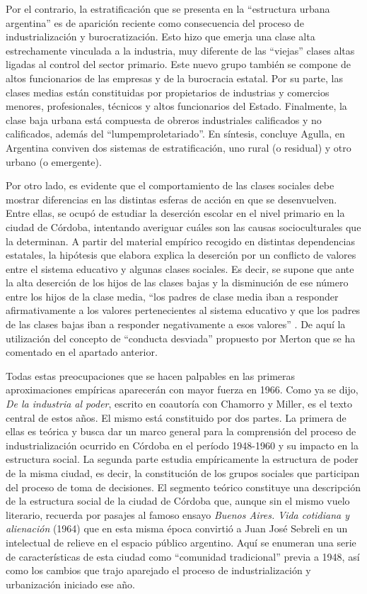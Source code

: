 Por el contrario, la estratificación que se presenta en la \enquote{estructura urbana argentina} es de aparición reciente como consecuencia del proceso de industrialización y burocratización. Esto hizo que emerja una clase alta estrechamente vinculada a la industria, muy diferente de las \enquote{viejas} clases altas ligadas al control del sector primario. Este nuevo grupo también se compone de altos funcionarios de las empresas y de la burocracia estatal. Por su parte, las clases medias están constituidas por propietarios de industrias y comercios menores, profesionales, técnicos y altos funcionarios del Estado. Finalmente, la clase baja urbana está compuesta de obreros industriales calificados y no calificados, además del \enquote{lumpemproletariado}. En síntesis, concluye Agulla, en Argentina conviven dos sistemas de estratificación, uno rural (o residual) y otro urbano (o emergente).

Por otro lado, es evidente que el comportamiento de las clases sociales debe mostrar diferencias en las distintas esferas de acción en que se desenvuelven. Entre ellas, se ocupó de estudiar la deserción escolar en el nivel primario en la ciudad de Córdoba, intentando averiguar cuáles son las causas socioculturales que la determinan. A partir del material empírico recogido en distintas dependencias estatales, la hipótesis que elabora explica la deserción por un conflicto de valores entre el sistema educativo y algunas clases sociales. Es decir, se supone que ante la alta deserción de los hijos de las clases bajas y la disminución de ese número entre los hijos de la clase media, \enquote{los padres de clase media iban a responder afirmativamente a los valores pertenecientes al sistema educativo y que los padres de las clases bajas iban a responder negativamente a esos valores} \parencite[34-35]{1642-AGULLA1964}. De aquí la utilización del concepto de \enquote{conducta desviada} propuesto por Merton que se ha comentado en el apartado anterior.

Todas estas preocupaciones que se hacen palpables en las primeras aproximaciones empíricas aparecerán con mayor fuerza en 1966. Como ya se dijo, \emph{De la industria al poder}, escrito en coautoría con Chamorro y Miller, es el texto central de estos años. El mismo está constituido por dos partes. La primera de ellas es teórica y busca dar un marco general para la comprensión del proceso de industrialización ocurrido en Córdoba en el período 1948-1960 y su impacto en la estructura social. La segunda parte estudia empíricamente la estructura de poder de la misma ciudad, es decir, la constitución de los grupos sociales que participan del proceso de toma de decisiones. El segmento teórico constituye una descripción de la estructura social de la ciudad de Córdoba que, aunque sin el mismo vuelo literario, recuerda por pasajes al famoso ensayo \emph{Buenos Aires. Vida cotidiana y alienación} (1964) que en esta misma época convirtió a Juan José Sebreli en un intelectual de relieve en el espacio público argentino. Aquí se enumeran una serie de características de esta ciudad como \enquote{comunidad tradicional} previa a 1948, así como los cambios que trajo aparejado el proceso de industrialización y urbanización iniciado ese año.

